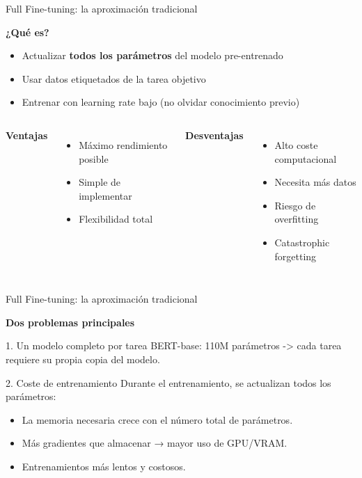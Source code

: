\begin{frame}{Full Fine-tuning: la aproximación tradicional}

\textbf{¿Qué es?}
\begin{itemize}
    \item Actualizar \textbf{todos los parámetros} del modelo pre-entrenado
    \item Usar datos etiquetados de la tarea objetivo
    \item Entrenar con learning rate bajo (no olvidar conocimiento previo)
\end{itemize}

\vspace{0.5em}

\begin{columns}
\textbf{Ventajas}
\begin{itemize}
    \item Máximo rendimiento posible
    \item Simple de implementar
    \item Flexibilidad total
\end{itemize}

\textbf{Desventajas}
\begin{itemize}
    \item Alto coste computacional
    \item Necesita más datos
    \item Riesgo de overfitting
    \item Catastrophic forgetting
\end{itemize}

\end{columns}

\end{frame}


\begin{frame}{Full Fine-tuning: la aproximación tradicional}

\textbf{Dos problemas principales}

\begin{alertblock}{1. Un modelo completo por tarea}
BERT-base: 110M parámetros -> cada tarea requiere su propia copia del modelo.
\end{alertblock}

\begin{alertblock}{2. Coste de entrenamiento}
Durante el entrenamiento, se actualizan todos los parámetros:
\begin{itemize}
    \item La memoria necesaria crece con el número total de parámetros.
    \item Más gradientes que almacenar → mayor uso de GPU/VRAM.
    \item Entrenamientos más lentos y costosos.
\end{itemize}
\end{alertblock}

\end{frame}



